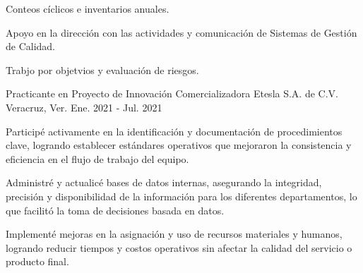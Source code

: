 \begin{cventries}
{\begin{cvitems}
		\item {Conteos cíclicos e inventarios anuales.}
		\item {Apoyo en la dirección con las actividades y comunicación de Sistemas de Gestión de Calidad.}
		\item {Trabjo por objetvios y evaluación de riesgos.}
      \end{cvitems}
    }
  \cventry
	{Practicante en Proyecto de Innovación} %
    {Comercializadora Etesla S.A. de C.V.} %
    {Veracruz, Ver.} %
    {Ene. 2021 - Jul. 2021} %
    {
      \begin{cvitems} %
        \item {Participé activamente en la identificación y documentación de procedimientos clave, logrando establecer estándares operativos que mejoraron la consistencia y eficiencia en el flujo de trabajo del equipo.}
        \item {Administré y actualicé bases de datos internas, asegurando la integridad, precisión y disponibilidad de la información para los diferentes departamentos, lo que facilitó la toma de decisiones basada en datos.}
        \item {Implementé mejoras en la asignación y uso de recursos materiales y humanos, logrando reducir tiempos y costos operativos sin afectar la calidad del servicio o producto final.}
      \end{cvitems}
    }

\end{cventries}
